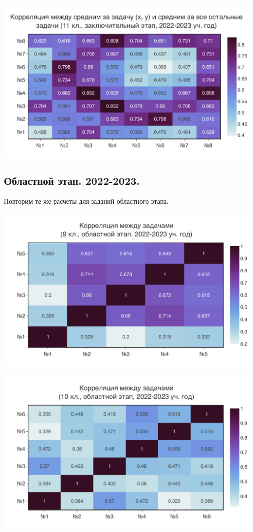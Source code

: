 \includegraphics[width=\linewidth]{../export/pdf/results/2023/respa/grade11-avg.pdf}

\subsection{Областной этап. 2022-2023.}
Повторим те же расчеты для заданий областного этапа.

\includegraphics[width=\linewidth]{../export/pdf/results/2023/oblast/grade9.pdf}

\includegraphics[width=\linewidth]{../export/pdf/results/2023/oblast/grade10.pdf}

